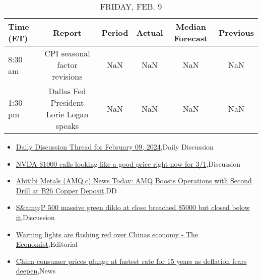 \documentclass{article}%
\begin{document}
%


\begin{table}[htbp]%
\caption{FRIDAY, FEB. 9}%
\centering%
\begin{adjustbox}{width=1\textwidth}%
\begin{tabular}{lccccc}
\toprule
Time (ET) &                                  Report & Period & Actual & Median Forecast & Previous \\
\midrule
  8:30 am &           CPI seasonal factor revisions &    NaN &    NaN &             NaN &      NaN \\
  1:30 pm & Dallas Fed President Lorie Logan speaks &    NaN &    NaN &             NaN &      NaN \\
\bottomrule
\end{tabular}
%
\end{adjustbox}%
\end{table}

%
\begin{itemize}%
\item%
\href{https://reddit.com/r/wallstreetbets/comments/1amlmos/daily\_discussion\_thread\_for\_february\_09\_2024/}{Daily Discussion Thread for February 09, 2024},Daily Discussion%
\item%
\href{https://reddit.com/r/wallstreetbets/comments/1amjf6z/nvda\_1000\_calls\_looking\_like\_a\_good\_price\_right/}{NVDA \$1000 calls looking like a good price right now for 3/1},Discussion%
\item%
\href{https://reddit.com/r/Baystreetbets/comments/1am6f7s/abitibi\_metals\_amqc\_news\_today\_amq\_boosts/}{Abitibi Metals (AMQ.c) News Today: AMQ Boosts Operations with Second Drill at B26 Copper Deposit},DD%
\item%
\href{https://reddit.com/r/StockMarket/comments/1am67oj/sp\_500\_massive\_green\_dildo\_at\_close\_breached\_5000/}{S\&amp;P 500 massive green dildo at close breached \$5000 but closed below it},Discussion%
\item%
\href{https://reddit.com/r/Economics/comments/1amfijg/warning\_lights\_are\_flashing\_red\_over\_chinas/}{Warning lights are flashing red over Chinas economy - The Economist},Editorial%
\item%
\href{https://reddit.com/r/Economics/comments/1am6f21/china\_consumer\_prices\_plunge\_at\_fastest\_rate\_for/}{China consumer prices plunge at fastest rate for 15 years as deflation fears deepen},News%
\end{itemize}%
\end{document}
